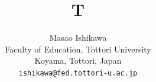 \documentclass{amsart}
\begin{document}
\title{T}
\author{Masao Ishikawa\\ \small Faculty of Education, Tottori University\\ \small Koyama, Tottori, Japan\\ \small \texttt{ishikawa@fed.tottori-u.ac.jp}}
\maketitle
\end{document}
